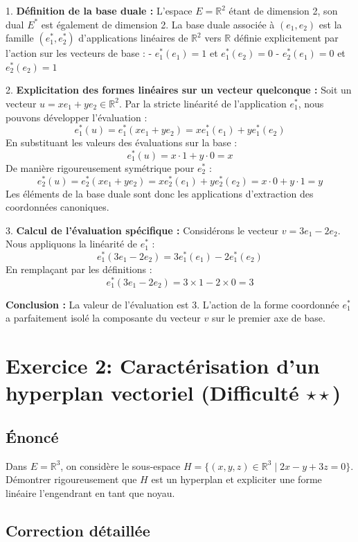 \documentclass[11pt,a4paper]{report}
\begin{document}
1. \textbf{Définition de la base duale :}
   L'espace $E = \mathbb{R}^2$ étant de dimension 2, son dual $E^*$ est également de dimension 2. La base duale associée à $(e_1, e_2)$ est la famille $(e_1^*, e_2^*)$ d'applications linéaires de $\mathbb{R}^2$ vers $\mathbb{R}$ définie explicitement par l'action sur les vecteurs de base :
   - $e_1^*(e_1) = 1$ et $e_1^*(e_2) = 0$
   - $e_2^*(e_1) = 0$ et $e_2^*(e_2) = 1$

2. \textbf{Explicitation des formes linéaires sur un vecteur quelconque :}
   Soit un vecteur $u = xe_1 + ye_2 \in \mathbb{R}^2$. Par la stricte linéarité de l'application $e_1^*$, nous pouvons développer l'évaluation :
   $$e_1^*(u) = e_1^*(xe_1 + ye_2) = x e_1^*(e_1) + y e_1^*(e_2)$$
   En substituant les valeurs des évaluations sur la base :
   $$e_1^*(u) = x \cdot 1 + y \cdot 0 = x$$
   De manière rigoureusement symétrique pour $e_2^*$ :
   $$e_2^*(u) = e_2^*(xe_1 + ye_2) = x e_2^*(e_1) + y e_2^*(e_2) = x \cdot 0 + y \cdot 1 = y$$
   Les éléments de la base duale sont donc les applications d'extraction des coordonnées canoniques.

3. \textbf{Calcul de l'évaluation spécifique :}
   Considérons le vecteur $v = 3e_1 - 2e_2$. Nous appliquons la linéarité de $e_1^*$ :
   $$e_1^*(3e_1 - 2e_2) = 3 e_1^*(e_1) - 2 e_1^*(e_2)$$
   En remplaçant par les définitions :
   $$e_1^*(3e_1 - 2e_2) = 3 \times 1 - 2 \times 0 = 3$$

\textbf{Conclusion :}
La valeur de l'évaluation est $3$. L'action de la forme coordonnée $e_1^*$ a parfaitement isolé la composante du vecteur $v$ sur le premier axe de base.

\section{Exercice 2: Caractérisation d'un hyperplan vectoriel (Difficulté $\star \star$)}

\subsection{Énoncé}
Dans $E = \mathbb{R}^3$, on considère le sous-espace $H = \{ (x, y, z) \in \mathbb{R}^3 \mid 2x - y + 3z = 0 \}$. Démontrer rigoureusement que $H$ est un hyperplan et expliciter une forme linéaire l'engendrant en tant que noyau.

\subsection{Correction détaillée}
\end{document}

